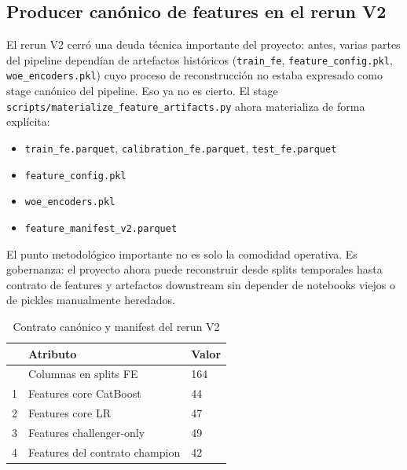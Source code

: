 \documentclass[
  spanish,
  11pt,
  letterpaper,
]{scrbook}
\providecommand{\tightlist}{%
  \setlength{\itemsep}{0pt}\setlength{\parskip}{0pt}}
\theoremstyle{plain}
\theoremstyle{remark}
\begin{document}
\subsection{Producer canónico de features en el rerun
V2}\label{producer-canuxf3nico-de-features-en-el-rerun-v2}

El rerun V2 cerró una deuda técnica importante del proyecto: antes,
varias partes del pipeline dependían de artefactos históricos
(\texttt{train\_fe}, \texttt{feature\_config.pkl},
\texttt{woe\_encoders.pkl}) cuyo proceso de reconstrucción no estaba
expresado como stage canónico del pipeline. Eso ya no es cierto. El
stage \texttt{scripts/materialize\_feature\_artifacts.py} ahora
materializa de forma explícita:

\begin{itemize}
\tightlist
\item
  \texttt{train\_fe.parquet}, \texttt{calibration\_fe.parquet},
  \texttt{test\_fe.parquet}
\item
  \texttt{feature\_config.pkl}
\item
  \texttt{woe\_encoders.pkl}
\item
  \texttt{feature\_manifest\_v2.parquet}
\end{itemize}

El punto metodológico importante no es solo la comodidad operativa. Es
gobernanza: el proyecto ahora puede reconstruir desde splits temporales
hasta contrato de features y artefactos downstream sin depender de
notebooks viejos o de pickles manualmente heredados.

{

\begin{longtable}[]{@{}lll@{}}

\caption{\label{tbl-feature-manifest-v2}Contrato canónico y manifest del
rerun V2}

\tabularnewline

\toprule\noalign{}
& Atributo & Valor \\
\midrule\noalign{}
\endhead
\bottomrule\noalign{}
\endlastfoot
0 & Columnas en splits FE & 164 \\
1 & Features core CatBoost & 44 \\
2 & Features core LR & 47 \\
3 & Features challenger-only & 49 \\
4 & Features del contrato champion & 42 \\

\end{longtable}

}
\end{document}
